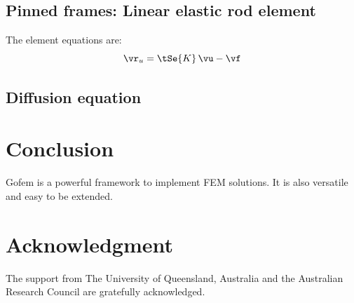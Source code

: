 \documentclass[twoside,journal]{IEEEtran}
\begin{document}
\subsection{Pinned frames: Linear elastic rod element}

The element equations are:
\begin{equation}
\vr_u = \tSe{K} \, \vu - \vf
\end{equation}




\subsection{Diffusion equation}



\section{Conclusion}
\label{sec:conclusion}

Gofem is a powerful framework to implement FEM solutions. It is also versatile and easy to be
extended.



\section*{Acknowledgment}

The support from The University of Queensland, Australia and the Australian Research Council are
gratefully acknowledged.





\end{document}
